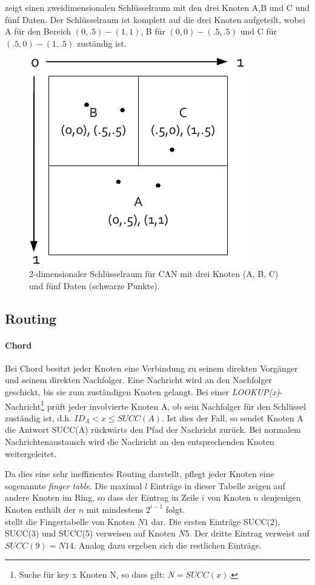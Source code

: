  zeigt einen zweidimensionalen Schlüsselraum mit den drei Knoten A,B und C und fünf Daten. Der Schlüsselraum ist komplett auf die drei Knoten aufgeteilt, wobei A für den Bereich $(0, .5)-(1, 1)$, B für $(0, 0)-(.5, .5)$ und C für $(.5, 0)-(1, .5)$ zuständig ist.

\begin{figure}[htbp]
\centering
\includegraphics{grafics/can_key_space.pdf}
\caption{2-dimensionaler Schlüsselraum für CAN mit drei Knoten (A, B, C) und fünf Daten (schwarze Punkte).}
\label{fig:can_key_space}
\end{figure}


\subsection*{Routing}
\paragraph{Chord}
Bei Chord besitzt jeder Knoten eine Verbindung zu seinem direkten Vorgänger und seinem direkten Nachfolger. Eine Nachricht wird an den Nachfolger geschickt, bis sie zum zuständigen Knoten gelangt. Bei einer \emph{LOOKUP(x)}-Nachricht\footnote{Suche für key x Knoten N, so dass gilt: $N = SUCC(x)$.} prüft jeder involvierte Knoten A, ob sein Nachfolger für den Schlüssel zuständig ist, d.h. $ID_A < x \le SUCC(A)$. Ist dies der Fall, so sendet Knoten A die Antwort SUCC(A) rückwärts den Pfad der Nachricht zurück. Bei normalem Nachrichtenaustausch wird die Nachricht an den entsprechenden Knoten weitergeleitet.

Da dies eine sehr ineffizientes  Routing darstellt, pflegt jeder Knoten eine sogenannte \emph{finger table}. Die maximal $l$ Einträge in dieser Tabelle zeigen auf andere Knoten im Ring, so dass der Eintrag in Zeile $i$ von Knoten $n$ denjenigen Knoten enthält der $n$ mit mindestens $2^{i-1}$ folgt.\\
 stellt die Fingertabelle von Knoten $N1$ dar. Die ersten Einträge SUCC(2), SUCC(3) und SUCC(5) verweisen auf Knoten $N5$. Der dritte Eintrag verweist auf $SUCC(9) = N14$. Analog dazu ergeben sich die restlichen Einträge.

